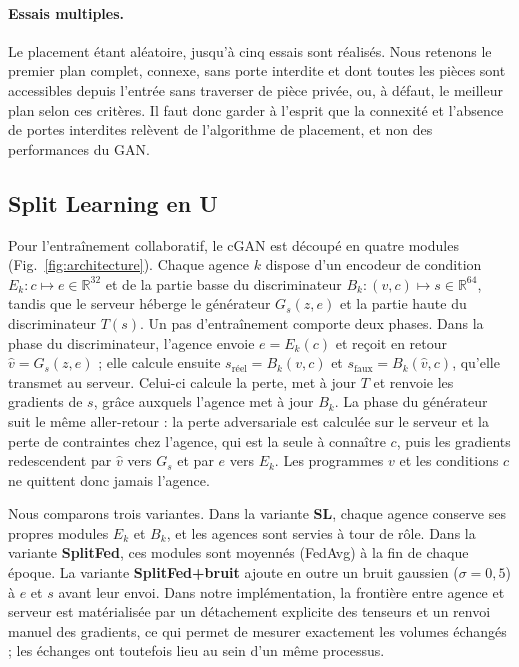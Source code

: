 \documentclass[twocolumn]{ICCKjournal}
\begin{document}
\paragraph{Essais multiples.}
Le placement étant aléatoire, jusqu'à cinq essais sont réalisés. Nous
retenons le premier plan complet, connexe, sans porte interdite et dont
toutes les pièces sont accessibles depuis l'entrée sans traverser de
pièce privée, ou, à défaut, le meilleur plan selon ces critères. Il faut
donc garder à l'esprit que la connexité et l'absence de portes
interdites relèvent de l'algorithme de placement, et non des
performances du GAN.

\subsection{Split Learning en U}

Pour l'entraînement collaboratif, le cGAN est découpé en quatre modules
(Fig.~\ref{fig:architecture}). Chaque agence $k$ dispose d'un encodeur
de condition $E_k : c\mapsto e\in\mathbb{R}^{32}$ et de la partie basse
du discriminateur $B_k : (v,c)\mapsto s\in\mathbb{R}^{64}$, tandis que le
serveur héberge le générateur $G_s(z,e)$ et la partie haute du
discriminateur $T(s)$. Un pas d'entraînement comporte deux phases.
Dans la phase du discriminateur, l'agence envoie $e=E_k(c)$ et reçoit
en retour $\hat v = G_s(z,e)$ ; elle calcule ensuite
$s_{\text{réel}}=B_k(v,c)$ et $s_{\text{faux}}=B_k(\hat v,c)$, qu'elle
transmet au serveur. Celui-ci calcule la perte, met à jour $T$ et
renvoie les gradients de $s$, grâce auxquels l'agence met à jour $B_k$.
La phase du générateur suit le même aller-retour : la perte
adversariale est calculée sur le serveur et la perte de contraintes
chez l'agence, qui est la seule à connaître $c$, puis les gradients
redescendent par $\hat v$ vers $G_s$ et par $e$ vers $E_k$. Les
programmes $v$ et les conditions $c$ ne quittent donc jamais l'agence.

Nous comparons trois variantes. Dans la variante \textbf{SL}, chaque
agence conserve ses propres modules $E_k$ et $B_k$, et les agences sont
servies à tour de rôle. Dans la variante \textbf{SplitFed}, ces modules
sont moyennés (FedAvg) à la fin de chaque époque. La variante
\textbf{SplitFed+bruit} ajoute en outre un bruit gaussien
($\sigma=0{,}5$) à $e$ et $s$ avant leur envoi. Dans notre
implémentation, la frontière entre agence et serveur est matérialisée
par un détachement explicite des tenseurs et un renvoi manuel des
gradients, ce qui permet de mesurer exactement les volumes échangés ;
les échanges ont toutefois lieu au sein d'un même processus.
\end{document}

